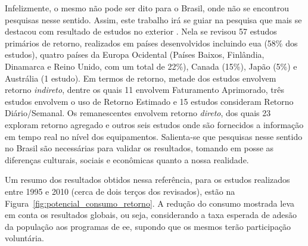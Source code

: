 Infelizmente, o mesmo não pode ser dito para o Brasil, onde não se
encontrou pesquisas nesse sentido. Assim, este trabalho irá se guiar
na pesquisa que mais se destacou com resultado de estudos no exterior
\cite{aceee_2010_estudos_feedback}. Nela se revisou 57 estudos
primários de retorno, realizados em países desenvolvidos incluindo
\gls{eua} (58\% dos estudos), quatro países da Europa Ocidental
(Países Baixos, Finlândia, Dinamarca e Reino Unido, com um total de
22\%), Canada (15\%), Japão (5\%) e Austrália (1 estudo). Em termos de
retorno, metade dos estudos envolvem retorno \emph{indireto}, dentre
os quais 11 envolvem Faturamento Aprimorado, três estudos envolvem o
uso de Retorno Estimado e 15 estudos consideram Retorno
Diário/Semanal. Os remanescentes envolvem retorno \emph{direto}, dos
quais 23 exploram retorno agregado e outros seis estudos onde são
fornecidos a informação em tempo real no nível dos equipamentos.
Salienta-se que pesquisas nesse sentido no Brasil são necessárias para
validar os resultados, tomando em posse as diferenças culturais,
sociais e econômicas quanto a nossa realidade.



Um resumo dos resultados obtidos nessa referência, para os estudos realizados entre 1995 e 
2010 (cerca de dois terços dos revisados), estão na Figura~\ref{fig:potencial_consumo_retorno}. 
A redução do consumo mostrada leva em conta os
resultados globais, ou seja, considerando a taxa esperada de adesão da população aos
programas de \gls{ee}, supondo que os mesmos terão participação voluntária. 

